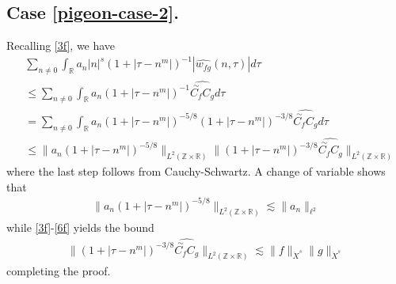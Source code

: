\documentclass[12pt,reqno]{amsart}
\numberwithin{equation}{section}  %
\numberwithin{figure}{section}
\newcommand{\rr}{\mathbb{R}}
\newcommand{\zz}{\mathbb{Z}}
\newcommand{\ci}{\mathbb{T}}
\newcommand{\wh}{\widehat}
\theoremstyle{plain}
\theoremstyle{definition}
\theoremstyle{remark}
\begin{document}
\subsection{Case \eqref{pigeon-case-2}.} Recalling \eqref{3f}, we have
%
\begin{equation}
	\begin{split}
		& \sum_{n \neq 0} \int_{\rr} a_n |n|^s \left( 1 + | \tau - n^{m } | \right)^{-1} | 
		\wh{w_{fg}}(n, \tau) | d \tau
		\\
		& \le \sum_{n \neq 0}  \int_{\rr} a_{n} (1+ | \tau - n^{m} |)^{-1} \wh{\overset{\sim}{C_f} C_g} d
		\tau
	\\	
	& = \sum_{n \neq 0} \int_{\rr} a_{n} (1+ | \tau - n^{m} |)^{-5/8} (1 + | \tau - n^{m}
	|)^{-3/8} \wh{\overset{\sim}{C_f} C_g} d
		\tau
		\\
		& \le \|a_{n} (1 + | \tau - n^{m} |)^{-5/8}\|_{L^2(\zz \times \rr)}  \| (1 +
		| \tau - n^{m} |)^{-3/8} \wh{\overset{\sim}{C_f} C_g}  \|_{L^2(\zz \times
		\rr)}
	\end{split}
\end{equation}
%
%
where the last step follows from Cauchy-Schwartz. A change of variable shows
that
%
%
\begin{equation*}
	\begin{split}
		\|a_{n} (1 + | \tau - n^{m} |)^{-5/8}\|_{L^2(\zz \times \rr)} \lesssim
		\|a_{n}\|_{\ell^2}
	\end{split}
\end{equation*}
%
%
while \eqref{3f}-\eqref{6f} yields the bound
%
%
\begin{equation*}
	\begin{split}
	\| (1 + | \tau - n^{m} |)^{-3/8} \wh{\overset{\sim}{C_f} C_g}  \|_{L^2(\zz
	\times \rr)} \lesssim \|f\|_{\dot{X}^s} \|g\|_{\dot{X}^s}
	\end{split}
\end{equation*}
%
%
completing the proof. \qquad \qedsymbol

%
%
%
\end{document}
